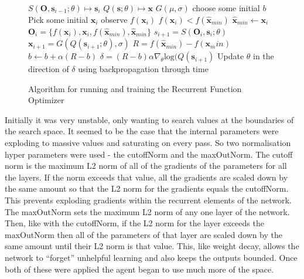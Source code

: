 \begin{figure}
\centering
\begin{minipage}{.8\textwidth}
\begin{algorithmic}
\State $S(\boldsymbol{O}, \boldsymbol{s}_{i-1}; \theta) \mapsto \boldsymbol{s}_i$
\State $Q(\boldsymbol{s} ;\theta) \mapsto \boldsymbol{x} $
\State $G(\mu,\sigma)$  
\State choose some initial $b$ 
 \Repeat
 	\State Pick some initial $\boldsymbol{x}_i$
 	\Repeat
 		\State observe $f(\boldsymbol{x}_i)$
 		\If $f(\boldsymbol{x}_i) < f(\hat{\boldsymbol{x}}_{min})$
 			\State$ \hat{\boldsymbol{x}}_{min} \gets \boldsymbol{x}_i$
 		\EndIf
 		\State $\boldsymbol{O}_i = \{f(\boldsymbol{x}_i),\boldsymbol{x}_i, f(\hat{\boldsymbol{x}}_{min}), \hat{\boldsymbol{x}}_{min}\} $
 		\State $s_{i+1} = S(\boldsymbol{O}_i, \boldsymbol{s}_{i}; \theta)$
 		\State $\boldsymbol{x}_{i+1} = G(Q(\boldsymbol{s}_{i+1};\theta),\sigma)$ 
	\State $R = f(\hat{\boldsymbol{x}}_{min}) - f(\boldsymbol{x}_min)$
	\State $b \gets b  + \alpha (R - b)$ 
	\State $\delta = (R - b) \alpha \nabla_\theta \text{log}(Q(\boldsymbol{s}_{i+1})$
	\State Update $\theta$ in the direction of $\delta$ using backpropagation through time
 \end{algorithmic}
 \end{minipage}
 \caption{Algorithm for running and training the Recurrent Function Optimizer}
 \label{alg:rfo}
\end{figure}

Initially it was very unstable, only wanting to search values at the boundaries of the search space. It seemed to be the case that the internal parameters were exploding to massive values and saturating on every pass. So two normalisation hyper parameters were used - the cutoffNorm and the maxOutNorm. The cutoff norm is the maximum L2 norm of all of the gradients of the parameters for all the layers. If the norm exceeds that value, all the gradients are scaled down by the same amount so that the L2 norm for the gradients equals the cutoffNorm. This prevents exploding gradients within the recurrent elements of the network. The maxOutNorm sets the maximum L2 norm of any one layer of the network. Then, like with the cutoffNorm, if the L2 norm for the layer exceeds the maxOutNorm then all of the parameters of that layer are scaled down by the same amount until their L2 norm is that value. This, like weight decay, allows the network to ``forget'' unhelpful learning and also keeps the outputs bounded. Once both of these were applied the agent began to use much more of the space.

